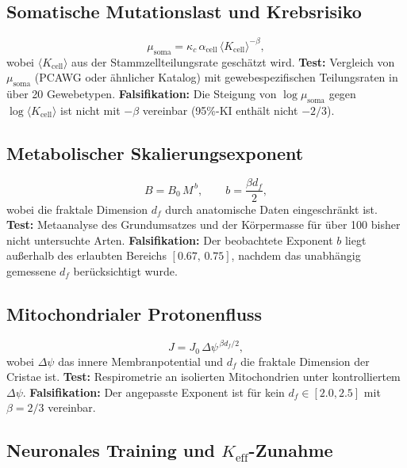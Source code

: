 \documentclass[11pt,a4paper]{article}
\begin{document}
	\subsection{Somatische Mutationslast und Krebsrisiko}
	
	\begin{equation}\label{eq:pred-somatic}
		\mu_{\mathrm{soma}} = \kappa_c\,\alpha_{\mathrm{cell}}\,
		\langle K_{\mathrm{cell}}\rangle^{-\beta},
	\end{equation}
	wobei \(\langle K_{\mathrm{cell}}\rangle\) aus der Stammzellteilungsrate geschätzt wird.
	\textbf{Test:} Vergleich von \(\mu_{\mathrm{soma}}\) (PCAWG oder ähnlicher Katalog) mit gewebespezifischen Teilungsraten in über 20 Gewebetypen.
	\textbf{Falsifikation:} Die Steigung von \(\log\mu_{\mathrm{soma}}\) gegen \(\log\langle K_{\mathrm{cell}}\rangle\) ist nicht mit \(-\beta\) vereinbar (95\%-KI enthält nicht \(-2/3\)).
	
	\subsection{Metabolischer Skalierungsexponent}
	
	\begin{equation}\label{eq:pred-metab}
		B = B_0\,M^{\,b}, \qquad
		b = \frac{\beta d_f}{2},
	\end{equation}
	wobei die fraktale Dimension \(d_f\) durch anatomische Daten eingeschränkt ist.
	\textbf{Test:} Metaanalyse des Grundumsatzes und der Körpermasse für über 100 bisher nicht untersuchte Arten.
	\textbf{Falsifikation:} Der beobachtete Exponent \(b\) liegt außerhalb des erlaubten Bereichs \([0.67,\,0.75]\), nachdem das unabhängig gemessene \(d_f\) berücksichtigt wurde.
	
	\subsection{Mitochondrialer Protonenfluss}
	
	\begin{equation}\label{eq:pred-mito}
		J = J_0\,\Delta\psi^{\,\beta d_f/2},
	\end{equation}
	wobei \(\Delta\psi\) das innere Membranpotential und \(d_f\) die fraktale Dimension der Cristae ist.
	\textbf{Test:} Respirometrie an isolierten Mitochondrien unter kontrolliertem \(\Delta\psi\).
	\textbf{Falsifikation:} Der angepasste Exponent ist für kein \(d_f\in[2.0,2.5]\) mit \(\beta=2/3\) vereinbar.
	
	\subsection{Neuronales Training und \(K_{\mathrm{eff}}\)-Zunahme}
	
\end{document}
